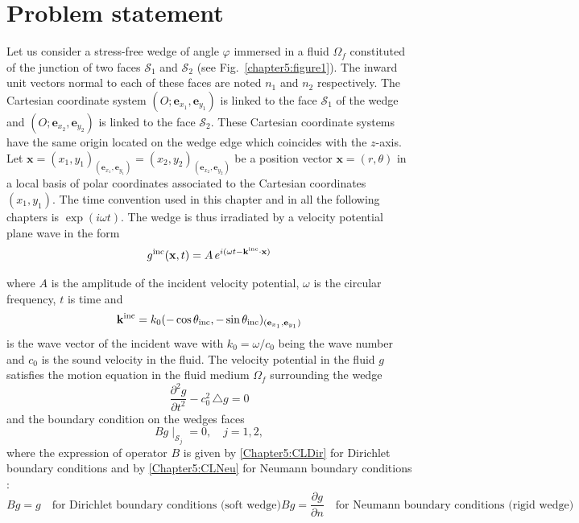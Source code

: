\section{Problem statement}
\label{Chapter5:problem}

Let us consider a stress-free wedge of angle $\varphi$ immersed in a fluid $\Omega_f$ constituted of the junction of two faces $\mathcal{S}_1$ and $\mathcal{S}_2$ (see Fig.~\ref{chapter5:figure1}). The inward unit vectors normal to each of these faces are noted $n_1$ and $n_2$ respectively. The Cartesian coordinate system $(O; \mathbf{e}_{x_1}, \mathbf{e}_{y_1} )$ is linked to the face $\mathcal{S}_1$ of the wedge and $(O;  \mathbf{e}_{x_2}, \mathbf{e}_{y_2} )$ is linked to the face $\mathcal{S}_2$. These Cartesian coordinate systems  have the same origin located on the wedge edge which coincides with the $z$-axis. Let $\mathbf{x} = (x_1,y_1)_{ (\mathbf{e}_{x_1}, \mathbf{e}_{y_1}) } = (x_2,y_2)_{ (\mathbf{e}_{x_2}, \mathbf{e}_{y_2})}$ be a position vector $\mathbf{x} = (r,\theta)$ in a local basis of polar coordinates associated to the Cartesian coordinates $(x_1,y_1)$. The time convention used in this chapter and in all the following chapters is $\exp(i\omega t)$. The wedge is thus irradiated by a velocity potential plane wave in the form
\begin{align}
\label{Chapter5:incidence_wave}
g^{\rm inc}(\mathbf{x},t) = A \, e^{i(\omega t - \mathbf{k}^{\rm inc} \cdot \mathbf{x})}
\end{align}

where $A$ is the amplitude of the incident velocity potential, $\omega$ is the circular frequency, $t$ is time and 
\begin{align}
\mathbf{k}^{\rm inc} = k_0 (-\cos \theta_{\rm inc},-\sin \theta_{\rm inc})_{(\mathbf{e}_{x_1}, \mathbf{e}_{y_1})}
\end{align}
is the wave vector of the incident wave with $k_0 = \omega/c_0$ being the wave number and $c_0$ is the sound velocity in the fluid.  The velocity potential in the fluid $g$ satisfies the motion equation in the fluid medium $\Omega_f$ surrounding the wedge 
\begin{equation}
\label{Chapter5:WaveMotion}
\frac{\partial^2 g}{\partial t^2} - c_0^2 \, \triangle g = 0
\end{equation}
and the boundary condition on the wedges faces
\begin{equation}
\label{Chapter5:CL}
Bg\mid_{\mathcal{S}_j} = 0, \quad j=1,2,
\end{equation}
where the expression of operator $B$ is given by \eqref{Chapter5:CLDir} for Dirichlet boundary conditions and by \eqref{Chapter5:CLNeu} for Neumann boundary conditions :
\begin{subequations}
\begin{equation}
\label{Chapter5:CLDir}
Bg = g \quad \mbox{for Dirichlet boundary conditions (soft wedge)}
\end{equation}
\begin{equation}
\label{Chapter5:CLNeu}
Bg = \frac{\partial g}{\partial n} \quad \mbox{for Neumann boundary conditions (rigid wedge)}
\end{equation}
\end{subequations}

